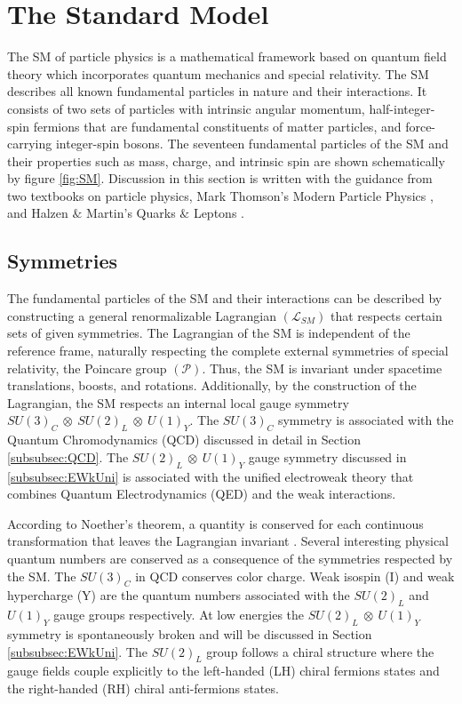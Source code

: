\section{The Standard Model}

\label{sec:SM}
The SM of particle physics is a mathematical framework based on quantum field theory which incorporates quantum mechanics and special relativity. The SM describes all known fundamental particles in nature and their interactions. It consists of two sets of particles with intrinsic angular momentum, half-integer-spin fermions that are fundamental constituents of matter particles, and force-carrying integer-spin bosons. The seventeen fundamental particles of the SM and their properties such as mass, charge, and intrinsic spin are shown schematically by figure \ref{fig:SM}. Discussion in this section is written with the guidance from two textbooks on particle physics, Mark Thomson's Modern Particle Physics \cite{Thomson:2013zua}, and Halzen $\&$ Martin's Quarks $\&$ Leptons \cite{Halzen:1984mc}.


\subsection{Symmetries}
\label{subsec:Symmetries}
The fundamental particles of the SM and their interactions can be described by constructing a general renormalizable Lagrangian $(\mathcal{L}_{SM})$ that respects certain sets of given symmetries. The Lagrangian of the SM is independent of the reference frame, naturally respecting the complete external symmetries of special relativity, the Poincare group $(\mathcal{P})$. Thus, the SM is invariant under spacetime translations, boosts, and rotations. Additionally, by the construction of the Lagrangian, the SM respects an internal local gauge symmetry $SU(3)_{C}~\otimes~SU(2)_{L}~\otimes~U(1)_{Y}$. The $SU(3)_{C}$ symmetry is associated with the Quantum Chromodynamics (QCD) discussed in detail in Section \ref{subsubsec:QCD}. The $SU(2)_{L}~\otimes~U(1)_{Y}$ gauge symmetry discussed in \ref{subsubsec:EWkUni} is associated with the unified electroweak theory that combines Quantum Electrodynamics (QED) and the weak interactions. 

According to Noether's theorem, a quantity is conserved for each continuous transformation that leaves the Lagrangian invariant \cite{NoetherTheorem}. Several interesting physical quantum numbers are conserved as a consequence of the symmetries respected by the SM. The $SU(3)_{C}$ in QCD conserves color charge. Weak isospin (I) and weak hypercharge (Y) are the quantum numbers associated with the $SU(2)_{L}$ and $U(1)_{Y}$ gauge groups respectively. At low energies the $SU(2)_{L}~\otimes~U(1)_{Y}$ symmetry is spontaneously broken and will be discussed in Section \ref{subsubsec:EWkUni}. The $SU(2)_{L}$ group follows a chiral structure where the gauge fields couple explicitly to the left-handed (LH) chiral fermions states and the right-handed (RH) chiral anti-fermions states.

